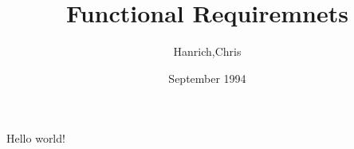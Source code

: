 \documentclass{article}
\title{Functional Requiremnets}
\author{Hanrich,Chris}
\date{September 1994}
\begin{document}
   \maketitle
   Hello world!
\end{document}

